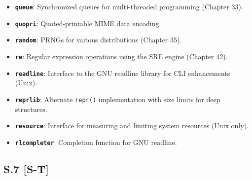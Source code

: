 \begin{itemize}
\item
  \textbf{\passthrough{\lstinline!queue!}}: Synchronized queues for
  multi-threaded programming (Chapter 33).
\item
  \textbf{\passthrough{\lstinline!quopri!}}: Quoted-printable MIME data
  encoding.
\item
  \textbf{\passthrough{\lstinline!random!}}: PRNGs for various
  distributions (Chapter 35).
\item
  \textbf{\passthrough{\lstinline!re!}}: Regular expression operations
  using the SRE engine (Chapter 42).
\item
  \textbf{\passthrough{\lstinline!readline!}}: Interface to the GNU
  readline library for CLI enhancements (Unix).
\item
  \textbf{\passthrough{\lstinline!reprlib!}}: Alternate
  \passthrough{\lstinline!repr()!} implementation with size limits for
  deep structures.
\item
  \textbf{\passthrough{\lstinline!resource!}}: Interface for measuring
  and limiting system resources (Unix only).
\item
  \textbf{\passthrough{\lstinline!rlcompleter!}}: Completion function
  for GNU readline.
\end{itemize}

\hypertarget{s.7-s-t}{%
\subsection{S.7 {[}S-T{]}}\label{s.7-s-t}}

